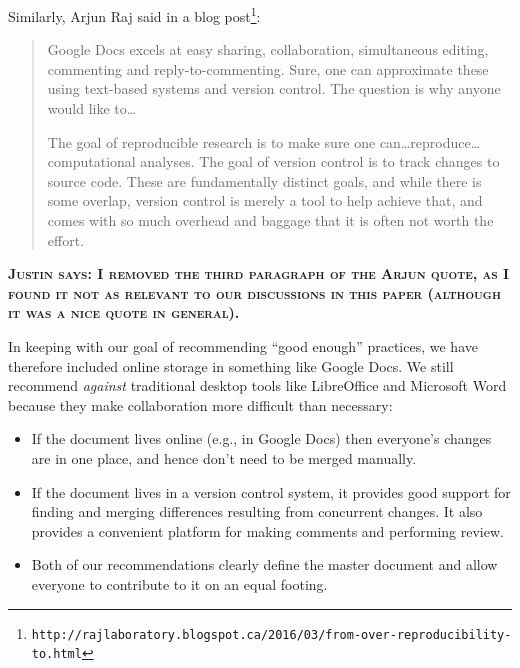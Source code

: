 \documentclass[10pt]{article}
\newcommand{\fixme}[1]{\textsc{\textbf{#1}}}
\newcommand{\withurl}[2]{{#1}\footnote{\texttt{#2}}}
\begin{document}
Similarly, Arjun Raj said in \withurl{a blog
  post}{http://rajlaboratory.blogspot.ca/2016/03/from-over-reproducibility-to.html}:

\begin{quote}
Google Docs excels at easy sharing, collaboration, simultaneous
editing, commenting and reply-to-commenting. Sure, one can approximate
these using text-based systems and version control. The question is
why anyone would like to{\ldots}

The goal of reproducible research is to make sure one
can{\dots}reproduce{\ldots}computational analyses. The goal of version
control is to track changes to source code. These are fundamentally
distinct goals, and while there is some overlap, version control is
merely a tool to help achieve that, and comes with so much overhead
and baggage that it is often not worth the effort.
\end{quote}

\fixme{Justin says: I removed the third paragraph of the Arjun quote, as I found it not as relevant to our discussions in this paper (although it was a nice quote in general).}

In keeping with our goal of recommending ``good enough'' practices, we
have therefore included online storage in something like Google Docs. We
still recommend \emph{against} traditional desktop tools like
LibreOffice and Microsoft Word because they make collaboration more
difficult than necessary:

\begin{itemize}
\item
  If the document lives online (e.g., in Google Docs) then everyone's
  changes are in one place, and hence don't need to be merged manually.
\item
  If the document lives in a version control system, it provides good
  support for finding and merging differences resulting from concurrent
  changes. It also provides a convenient platform for making comments
  and performing review.
\item
  Both of our recommendations clearly define the master document and
  allow everyone to contribute to it on an equal footing.
\end{itemize}
\end{document}
